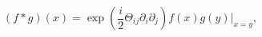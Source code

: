 \begin{equation}
(f*g)(x)=\exp (\frac{i}{2}\Theta_{ij}\partial_{i}\partial_{j})f(x)g(y)|_{x=y},
\end{equation}

